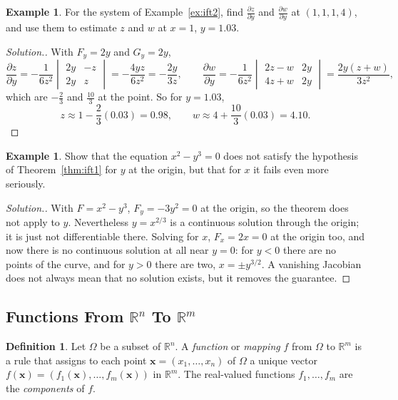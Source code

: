 \documentclass[11pt,a4paper]{article}
\theoremstyle{definition}
\newtheorem{defn}[thm]{Definition}
\newtheorem{exa}[thm]{Example}
\newenvironment{solution}
  {\renewcommand{\qedsymbol}{}\begin{proof}[\textit{Solution}.]}
  {\end{proof}}
\begin{document}
\begin{exa}
\label{ex:ift2y}
For the system of Example~\ref{ex:ift2}, find $\frac{\partial z}{\partial y}$ and
$\frac{\partial w}{\partial y}$ at $(1,1,1,4)$, and use them to estimate $z$ and
$w$ at $x = 1$, $y = 1.03$.
\end{exa}

\begin{solution}
With $F_y = 2y$ and $G_y = 2y$,
\[\frac{\partial z}{\partial y} = -\frac{1}{6z^2}\begin{vmatrix} 2y & -z\\ 2y &
z\end{vmatrix} = -\frac{4yz}{6z^2} = -\frac{2y}{3z},\qquad \frac{\partial
w}{\partial y} = -\frac{1}{6z^2}\begin{vmatrix} 2z - w & 2y\\ 4z + w &
2y\end{vmatrix} = \frac{2y(z + w)}{3z^2},\]
which are $-\frac23$ and $\frac{10}{3}$ at the point. So for $y = 1.03$,
\[z\approx 1 - \frac23(0.03) = 0.98,\qquad w\approx 4 + \frac{10}{3}(0.03) =
4.10 .\]
\end{solution}

\begin{exa}
\label{ex:iftfail}
Show that the equation $x^2 - y^3 = 0$ does not satisfy the hypothesis of
Theorem~\ref{thm:ift1} for $y$ at the origin, but that for $x$ it fails even
more seriously.
\end{exa}

\begin{solution}
With $F = x^2 - y^3$, $F_y = -3y^2 = 0$ at the origin, so the theorem does not
apply to $y$. Nevertheless $y = x^{2/3}$ is a continuous solution through the
origin; it is just not differentiable there. Solving for $x$, $F_x = 2x = 0$ at
the origin too, and now there is no continuous solution at all near $y = 0$:
for $y<0$ there are no points of the curve, and for $y>0$ there are two,
$x = \pm y^{3/2}$. A vanishing Jacobian does not always mean that no solution
exists, but it removes the guarantee.
\end{solution}


{\color[wave]{485}\subsection{Functions From $\mathbb{R}^n$ To $\mathbb{R}^m$}}

\begin{defn}
\label{defn:mapping}
Let $\Omega$ be a subset of $\mathbb{R}^n$. A \emph{function} or \emph{mapping}
$f$ from $\Omega$ to $\mathbb{R}^m$ is a rule that assigns to each point
$\mathbf x = (x_1, \dots , x_n)$ of $\Omega$ a unique vector
$f(\mathbf x) = (f_1(\mathbf x),\dots,f_m(\mathbf x))$ in $\mathbb{R}^m$. The
real-valued functions $f_1,\dots,f_m$ are the \emph{components} of $f$.
\end{defn}
\end{document}
